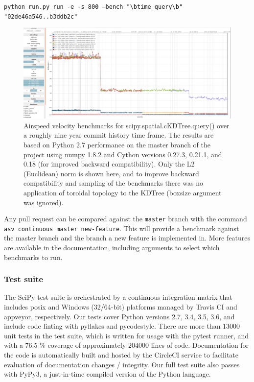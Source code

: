 \documentclass[fleqn,10pt]{wlscirep}
\begin{document}
    \texttt{python run.py run -e -s 800 --bench "\textbackslash btime\_query\textbackslash b" "02de46a546..b3ddb2c"}

    \begin{figure}[H]
        \centering
        \includegraphics[width=\textwidth]{static/asv_time_query_ckdtree}
        \caption{Airspeed velocity benchmarks for scipy.spatial.cKDTree.query() over a roughly nine year commit history time frame. The results are based on Python 2.7 performance on the master branch of the project using numpy 1.8.2 and Cython versions 0.27.3, 0.21.1, and 0.18 (for improved backward compatibility). Only the L2 (Euclidean) norm is shown here, and to improve backward compatibility and sampling of the benchmarks there was no application of toroidal topology to the KDTree (boxsize argument was ignored).}
        \label{fig:asvbench}
    \end{figure}

   Any pull request can be compared against the \texttt{master} branch with the command \texttt{asv continuous master new-feature}. This will provide a benchmark against the master branch and the branch a new feature is implemented in. More features are available in the documentation, including arguments to select which benchmarks to run.

    \subsubsection*{Test suite}
    The SciPy test suite is orchestrated by a continuous integration matrix
    that includes posix and Windows (32/64-bit) platforms managed by Travis CI and appveyor,
    respectively. Our tests cover Python versions 2.7, 3.4, 3.5, 3.6, and include
    code linting with pyflakes and pycodestyle. There are more than $13000$ unit
    tests in the test suite, which is written for usage with the pytest runner, and
    with a 76.5 \% coverage of approximately $204000$ lines
    of code. Documentation for the code is automatically built and hosted by the
    CircleCI service to facilitate evaluation of documentation changes / integrity.
    Our full test suite also passes with PyPy3, a just-in-time compiled version
    of the Python language.
\end{document}
